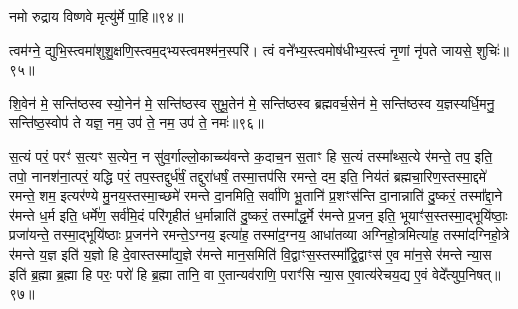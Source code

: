 नमो रुद्राय विष्णवे मृत्यु॑र्मे पा॒हि॥९४॥\anuvakamend


त्वम॑ग्ने॒ द्युभि॒स्त्वमा॑शुशु॒क्षणि॒स्त्वम॒द्भ्यस्त्वमश्म॑न॒स्परि॑। 
त्वं वने᳚भ्य॒स्त्वमोष॑धीभ्य॒स्त्वं नृ॒णां नृ॑पते जायसे॒ शुचिः॑॥९५॥\anuvakamend

शि॒वेन॑ मे॒ सन्ति॑ष्ठस्व स्यो॒नेन॑  मे॒ सन्ति॑ष्ठस्व सुभू॒तेन॑  मे॒ सन्ति॑ष्ठस्व ब्रह्मवर्च॒सेन॑  मे॒ सन्ति॑ष्ठस्व य॒ज्ञस्यर्धि॒मनु॒ सन्ति॑ष्ठ॒स्वोप॑ ते यज्ञ॒ नम॒ उप॑ ते॒ नम॒ उप॑ ते॒ नमः॑॥९६॥\anuvakamend

\newcommand{\sep}{{\small$\circ$} }
स॒त्यं परं॒ परꣳ॑ स॒त्यꣳ स॒त्येन॒ न सु॑व॒र्गाल्लो॒काच्च्य॑वन्ते क॒दाच॒न स॒ताꣳ हि स॒त्यं तस्मा᳚थ्स॒त्ये र॑मन्ते॒
तप॒ इति॒ तपो॒ नानश॑ना॒त्परं॒ यद्धि परं॒ तप॒स्तद्दुर्ध॑र्\mbox{}षं॒ तद्दुरा॑धर्\mbox{}षं॒ तस्मा॒त्तप॑सि रमन्ते॒
दम॒ इति॒ निय॑तं ब्रह्मचा॒रिण॒स्तस्मा॒द्दमे॑ रमन्ते॒
शम॒ इत्यर॑ण्ये मु॒नय॒स्तस्मा॒च्छमे॑ रमन्ते
दा॒नमिति॒ सर्वा॑णि भू॒तानि॑ प्र॒शꣳस॑न्ति दा॒नान्नाति॑ दु॒ष्करं॒ तस्मा᳚द्दा॒ने र॑मन्ते
ध॒र्म इति॒ धर्मे॑ण॒ सर्व॑मि॒दं परि॑गृहीतं ध॒र्मान्नाति॑ दु॒ष्करं॒ तस्मा᳚द्ध॒र्मे र॑मन्ते
प्र॒जन॒ इति॒ भूयाꣳ॑स॒स्तस्मा॒द्भूयि॑ष्ठाः॒ प्रजा॑यन्ते॒ तस्मा॒द्भूयि॑ष्ठाः प्र॒जन॑ने रमन्ते॒ऽग्नय॒
इत्या॑ह॒ तस्मा॑द॒ग्नय॒ आधा॑तव्या अग्निहो॒त्रमित्या॑ह॒ तस्मा॑दग्निहो॒त्रे र॑मन्ते
य॒ज्ञ इति॑ य॒ज्ञो हि दे॒वास्तस्मा᳚द्य॒ज्ञे र॑मन्ते
मान॒समिति॑ वि॒द्वाꣳस॒स्तस्मा᳚द्वि॒द्वाꣳस॑ ए॒व मा॑न॒से र॑मन्ते
न्या॒स इति॑ ब्र॒ह्मा ब्र॒ह्मा हि परः॒ परो॑ हि ब्र॒ह्मा तानि॒ वा ए॒तान्यव॑राणि॒ पराꣳ॑सि न्या॒स ए॒वात्य॑रेचय॒द्य ए॒वं वेदे᳚त्युप॒निषत्॥९७॥
\anuvakamend


